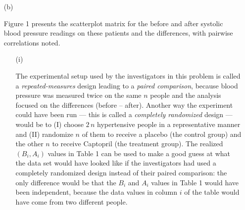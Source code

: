 \documentclass[12pt]{article}
\begin{document}
\begin{itemize}
\begin{figure}[!b]
\end{figure}

\item[(b)]

Figure 1 presents the scatterplot matrix for the before and after
systolic blood pressure readings on these patients and the differences,
with pairwise correlations noted. 

\begin{itemize}

\item[(i)]

The experimental setup used by the investigators in this problem is called a \textit{repeated-measures} design leading to a \textit{paired comparison}, because blood pressure was measured twice on the same $n$ people and the analysis focused on the differences (before -- after). Another way the experiment could have been run --- this is called a \textit{completely randomized} design --- would be to (I) choose $2 \, n$ hypertensive people in a representative manner and (II) randomize $n$ of them to receive a placebo (the control group) and the other $n$ to receive Captopril (the treatment group). The realized $( B_i, A_i )$ values in Table 1 can be used to make a good guess at what the data set would have looked like if the investigators had used a completely randomized design instead of their paired comparison: the only difference would be that the $B_i$ and $A_i$ values in Table 1 would have been independent, because the data values in column $i$ of the table would have come from two different people. 


\end{itemize}
\end{itemize}
\end{document}
